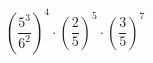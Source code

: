 \begin{ex}[type=calculate]
	\begin{condition}
		\( \left( \dfrac{5^3}{6^2} \right)^4\cdot\left( \dfrac{2}{5} \right)^5\cdot\left( \dfrac{3}{5} \right)^7 \)
	\end{condition}
\end{ex}